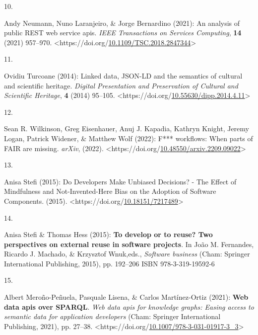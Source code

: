 \begin{thebibliography}{9}
\hypertarget{ref-neumannAnalysisPublicREST2021a}{}
10.

Andy Neumann, Nuno Laranjeiro, \& Jorge Bernardino (2021): An analysis
of public {REST} web service apis. \emph{IEEE Transactions on Services
Computing}, \textbf{14} (2021) 957--970.
\textless https://doi.org/\href{https://doi.org/10.1109/TSC.2018.2847344}{10.1109/TSC.2018.2847344}\textgreater{}

\hypertarget{ref-turcoaneLinkedDataJSONLD2014a}{}
11.

Ovidiu Turcoane (2014): Linked data, {JSON-LD} and the semantics of
cultural and scientific heritage. \emph{Digital Presentation and
Preservation of Cultural and Scientific Heritage}, \textbf{4} (2014)
95--105.
\textless https://doi.org/\href{https://doi.org/10.55630/dipp.2014.4.11}{10.55630/dipp.2014.4.11}\textgreater{}

\hypertarget{ref-wilkinsonWorkflowsWhenParts2022b}{}
12.

Sean R. Wilkinson, Greg Eisenhauer, Anuj J. Kapadia, Kathryn Knight,
Jeremy Logan, Patrick Widener, \& Matthew Wolf (2022): F*** workflows:
When parts of {FAIR} are missing. \emph{arXiv}, (2022).
\textless https://doi.org/\href{https://doi.org/10.48550/arxiv.2209.09022}{10.48550/arxiv.2209.09022}\textgreater{}

\hypertarget{ref-stefiDevelopersMakeUnbiased2015}{}
13.

Anisa Stefi (2015): Do {Developers Make Unbiased Decisions}? - {The
Effect} of {Mindfulness} and {Not-Invented-Here Bias} on the {Adoption}
of {Software Components}. (2015).
\textless https://doi.org/\href{https://doi.org/10.18151/7217489}{10.18151/7217489}\textgreater{}

\hypertarget{ref-stefiDevelopReuseTwo2015a}{}
14.

Anisa Stefi \& Thomas Hess (2015): \textbf{To develop or to reuse? {Two}
perspectives on external reuse in software projects}. In João M.
Fernandes, Ricardo J. Machado, \& Krzysztof Wnuk,eds., \emph{Software
business} ({Cham}: {Springer International Publishing}, 2015), pp.
192--206 ISBN 978-3-319-19592-6

\hypertarget{ref-merono-penuelaWebDataApis2021b}{}
15.

Albert Meroño-Peñuela, Pasquale Lisena, \& Carlos Martínez-Ortiz (2021):
\textbf{Web data apis over {SPARQL}}. \emph{Web data apis for knowledge
graphs: {Easing} access to semantic data for application developers}
({Cham}: {Springer International Publishing}, 2021), pp. 27--38.
\textless https://doi.org/\href{https://doi.org/10.1007/978-3-031-01917-3_3}{10.1007/978-3-031-01917-3\_3}\textgreater{}


\end{thebibliography}
